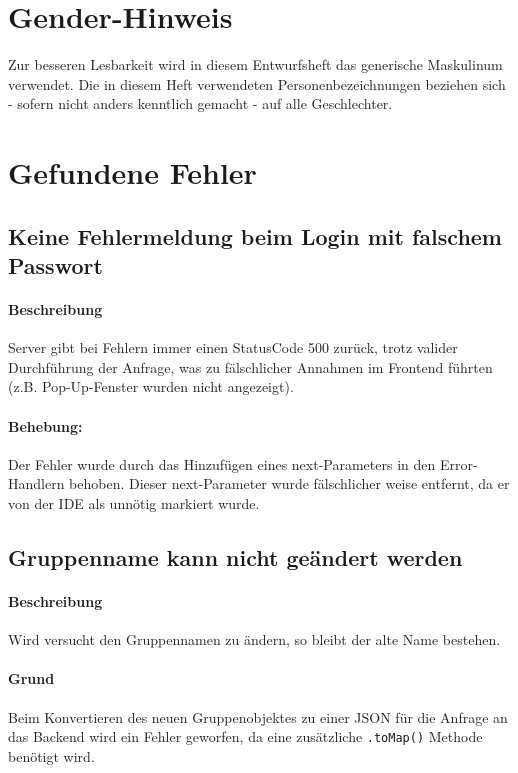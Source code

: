 \documentclass{qualitätssicherungsheft}
\begin{document}

\maketitle
\tableofcontents
\newpage

\section*{Gender-Hinweis}
Zur besseren Lesbarkeit wird in diesem Entwurfsheft das generische Maskulinum verwendet.
Die in diesem Heft verwendeten Personenbezeichnungen beziehen sich - sofern nicht anders kenntlich gemacht - auf alle Geschlechter.
\newpage
\section{Gefundene Fehler}
\subsection{Keine Fehlermeldung beim Login mit falschem Passwort}
\paragraph*{Beschreibung} Server gibt bei Fehlern immer einen StatusCode 500 zurück, trotz valider Durchführung der Anfrage, was zu fälschlicher Annahmen im Frontend führten (z.B. Pop-Up-Fenster wurden nicht angezeigt). 
\paragraph*{Behebung:} Der Fehler wurde durch das Hinzufügen eines
next-Parameters in den Error-Handlern behoben. Dieser next-Parameter wurde fälschlicher weise entfernt, da er von der IDE als unnötig markiert wurde. 
\newpage
\subsection{Gruppenname kann nicht geändert werden}
\paragraph*{Beschreibung} Wird versucht den Gruppennamen zu ändern, so bleibt der alte Name bestehen.
\paragraph{Grund} Beim Konvertieren des neuen Gruppenobjektes zu einer JSON für die Anfrage an das Backend wird ein Fehler geworfen, da eine zusätzliche \texttt{.toMap()} Methode benötigt wird.
\end{document}
